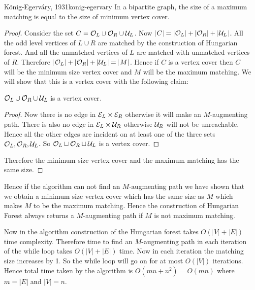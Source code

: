 \begin{Theorem}{K\"{o}nig-Egerv\'{a}ry, 1931}{konig-egervary}
	In a bipartite graph, the size of a maximum matching is equal to the size of minimum vertex cover.
\end{Theorem}
\begin{proof}
	Consider the set $C=\mathcal{O}_L\cup \mathcal{O}_R\cup \mathcal{U}_L$. Now $|C|=|\mathcal{O}_L|+|\mathcal{O}_R|+|\mathcal{U}_L|$. All the odd level vertices of $L\cup R$ are matched by the construction of Hungarian forest. And all the unmatched vertices of $L$ are matched with unmatched vertices of $R$. Therefore $|\mathcal{O}_L|+|\mathcal{O}_R|+|\mathcal{U}_L|=|M|$. Hence if $C$ is a vertex cover then $C$ will be the minimum size vertex cover and $M$ will be the maximum matching. We will show that this is a vertex cover with the following claim:
	\begin{claimwidth}
		\begin{claim}{}{}
			$\mathcal{O}_L\cup \mathcal{O}_R\cup \mathcal{U}_L$ is a vertex cover.
		\end{claim}
		\begin{proof}
			Now there is no edge in $\mathcal{E}_L\times \mathcal{E}_R$ otherwise it will make an $M$-augmenting path. There is also no edge in $\mathcal{E}_L\times \mathcal{U}_R$  otherwise $\mathcal{U}_R$ will not be unreachable. Hence all the other edges are incident on at least  one of the three sets $\mathcal{O}_L,\mathcal{O}_R,\mathcal{U}_L$. So $\mathcal{O}_L\sqcup \mathcal{O}_R\sqcup \mathcal{U}_L$ is a vertex cover. 
		\end{proof}
	\end{claimwidth}
	Therefore the minimum size vertex cover and the maximum matching has the same size.
\end{proof}

Hence if the algorithm can not find an $M$-augmenting path we have shown that we obtain a  minimum size vertex cover which has the same size as $M$ which makes $M$ to be the maximum matching. Hence the construction of Hungarian Forest always returns a $M$-augmenting path if $M$ is not maximum matching.

Now in the algorithm construction of the Hungarian forest takes $O(|V|+|E|)$ time complexity. Therefore time to find an $M$-augmenting path in each iteration of the while loop takes $O(|V|+|E|)$ time. Now in each iteration the matching size increases by 1. So the while loop will go on for at most $O(|V|)$ iterations. Hence total time taken by the algorithm is $O(mn+n^2)=O(mn)$ where $m=|E|$ and  $|V|=n$.
